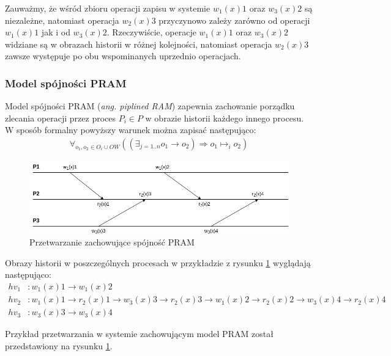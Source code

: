 Zauważmy, że wśród zbioru operacji zapisu w systemie $ w_1(x)1 $ oraz $ w_3(x)2 $ są niezależne, natomiast operacja $ w_2(x)3 $ przyczynowo zależy zarówno od operacji $ w_1(x)1 $ jak i od $ w_3(x)2 $. Rzeczywiście, operacje $ w_1(x)1 $ oraz $ w_3(x)2 $ widziane są w obrazach historii w różnej kolejności, natomiast operacja $ w_2(x)3 $ zawsze występuje po obu wspominanych uprzednio operacjach.

\subsubsection{Model spójności PRAM}
Model spójności PRAM (\textit{ang. piplined RAM}) zapewnia zachowanie porządku zlecania operacji przez proces $ P_i \in P $ w obrazie historii każdego innego procesu. W sposób formalny powyższy warunek można zapisać następująco:
\begin{align*}
    \forall_{o_1, o_2 \in O_i \cup OW} ((\exists_{j=1..n} o_1 \rightarrow o_2) \Rightarrow o_1 \mapsto_i o_2)
\end{align*}

\begin{figure}
    \includegraphics[width=\linewidth]{images/02-pram.png}
    \caption{Przetwarzanie zachowujące spójność PRAM}
    \label{figure:replication_pram}
\end{figure}

Obrazy historii w poszczególnych procesach w przykładzie z rysunku \ref{figure:replication_pram} wyglądają następująco:
\begin{align*}
    hv_1&: w_1(x)1 \rightarrow w_1(x)2 \\
    hv_2&: w_1(x)1 \rightarrow r_2(x)1 \rightarrow w_3(x)3 \rightarrow r_2(x)3 \rightarrow w_1(x)2 \rightarrow r_2(x)2 \rightarrow w_3(x)4 \rightarrow r_2(x)4 \\
    hv_3&: w_3(x)3 \rightarrow w_3(x)4
\end{align*}

Przykład przetwarzania w systemie zachowującym model PRAM został przedstawiony na rysunku \ref{figure:replication_pram}.

